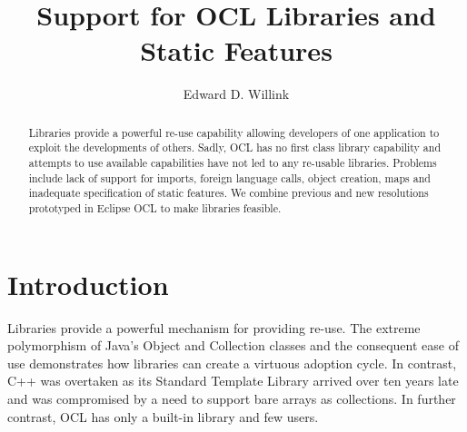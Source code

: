\documentclass[sigconf]{acmart}
\begin{document}
\title{Support for OCL Libraries and Static Features}

\author{Edward D. Willink}


\begin{abstract}
  Libraries provide a powerful re-use capability allowing developers of one application to exploit the developments of others. Sadly, OCL has no first class library capability and attempts to use available capabilities have not led to any re-usable libraries. Problems include lack of support for imports, foreign language calls, object creation, maps and inadequate specification of static features. We combine previous and new resolutions prototyped in Eclipse OCL to make libraries feasible. 
\end{abstract}


\maketitle

\section{Introduction}\label{Introduction}
Libraries provide a powerful mechanism for providing re-use. The extreme polymorphism of Java's Object and Collection classes and the consequent ease of use demonstrates how libraries can create a virtuous adoption cycle. In contrast, C++ was overtaken as its Standard Template Library arrived over ten years late and was compromised by a need to support bare arrays as collections. In further contrast, OCL has only a built-in library and few users.
  
\end{document}
